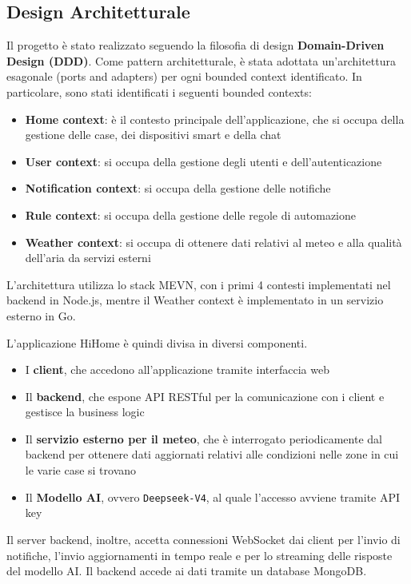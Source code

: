 \documentclass[a4paper,12pt]{article}
\begin{document}
\subsection{Design Architetturale}
Il progetto è stato realizzato seguendo la filosofia di design \textbf{Domain-Driven Design (DDD)}. Come pattern architetturale, è stata adottata un'architettura esagonale (ports and adapters) per ogni bounded context identificato. In particolare, sono stati identificati i seguenti bounded contexts:
\begin{itemize}
    \item \textbf{Home context}: è il contesto principale dell'applicazione, che si occupa della gestione delle case, dei dispositivi smart e della chat
    \item \textbf{User context}: si occupa della gestione degli utenti e dell'autenticazione
    \item \textbf{Notification context}: si occupa della gestione delle notifiche
    \item \textbf{Rule context}: si occupa della gestione delle regole di automazione
    \item \textbf{Weather context}: si occupa di ottenere dati relativi al meteo e alla qualità dell'aria da servizi esterni
\end{itemize}
L'architettura utilizza lo stack MEVN, con i primi 4 contesti implementati nel backend in Node.js, mentre il Weather context è implementato in un servizio esterno in Go.

L'applicazione HiHome è quindi divisa in diversi componenti. 
\begin{itemize}
    \item I \textbf{client}, che accedono all'applicazione tramite interfaccia web
    \item Il \textbf{backend}, che espone API RESTful per la comunicazione con i client e gestisce la business logic
    \item Il \textbf{servizio esterno per il meteo}, che è interrogato periodicamente dal backend per ottenere dati aggiornati relativi alle condizioni nelle zone in cui le varie case si trovano
    \item Il \textbf{Modello AI}, ovvero \texttt{Deepseek-V4}, al quale l'accesso avviene tramite API key
\end{itemize}

Il server backend, inoltre, accetta connessioni WebSocket dai client per l'invio di notifiche, l'invio aggiornamenti in tempo reale e per lo streaming delle risposte del modello AI. Il backend accede ai dati tramite un database MongoDB.
\end{document}
